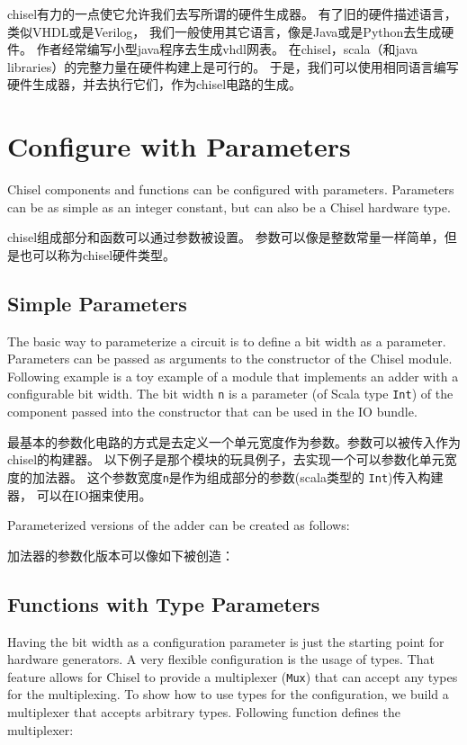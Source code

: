 \documentclass[%
    10pt,
    headinclude, footexclude,
    openright, %
    notitlepage,
    cleardoubleempty,
    headsepline,
    pointlessnumbers,
    bibtotoc, idxtotoc,
    ]{scrbook}
\newcommand{\code}[1]{{\small{\texttt{#1}}}}
\begin{document}
chisel有力的一点使它允许我们去写所谓的硬件生成器。
有了旧的硬件描述语言，类似VHDL或是Verilog，
我们一般使用其它语言，像是Java或是Python去生成硬件。
作者经常编写小型java程序去生成vhdl网表。
在chisel，scala（和java libraries）的完整力量在硬件构建上是可行的。
于是，我们可以使用相同语言编写硬件生成器，并去执行它们，作为chisel电路的生成。

\section{Configure with Parameters}

Chisel components and functions can be configured with parameters.
Parameters can be as simple as an integer constant, but can also be a Chisel
hardware type.

chisel组成部分和函数可以通过参数被设置。
参数可以像是整数常量一样简单，但是也可以称为chisel硬件类型。

\subsection{Simple Parameters}

The basic way to parameterize a circuit is to define a bit width as a parameter.
Parameters can be passed as arguments to
the constructor of the Chisel module. Following example is a toy example of
a module that implements an adder with a configurable bit width.
The bit width \code{n} is a parameter (of Scala type \code{Int}) of the component
passed into the constructor that can be used in the IO bundle.

最基本的参数化电路的方式是去定义一个单元宽度作为参数。参数可以被传入作为chisel的构建器。
以下例子是那个模块的玩具例子，去实现一个可以参数化单元宽度的加法器。
这个参数宽度\code{n}是作为组成部分的参数(scala类型的 \code{Int})传入构建器，
可以在IO捆束使用。


\noindent Parameterized versions of the adder can be created as follows:

\noindent 加法器的参数化版本可以像如下被创造：


\subsection{Functions with Type Parameters}

Having the bit width as a configuration parameter is just the starting point for
hardware generators. A very flexible configuration is the usage of types.
That feature allows for Chisel to provide a multiplexer (\code{Mux}) that
can accept any types for the multiplexing.
To show how to use types for the configuration, we build a multiplexer
that accepts arbitrary types. Following function defines the multiplexer:
\end{document}
